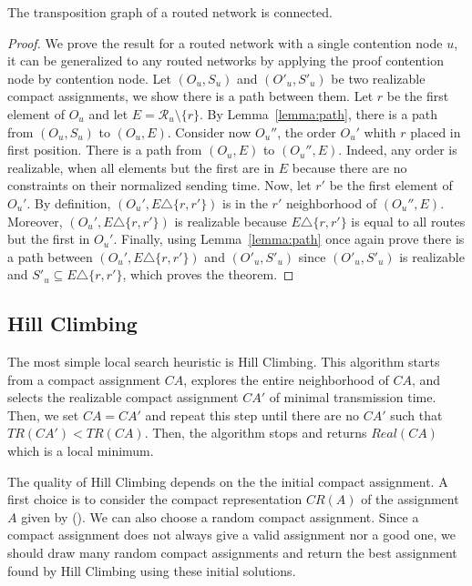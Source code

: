  \begin{theorem}
 The transposition graph of a routed network is connected.
 \end{theorem}
 \begin{proof}
 We prove the result for a routed network with a single contention node $u$, it can be generalized to any routed networks 
 by applying the proof contention node by contention node. Let $(O_u,S_u)$ and $(O'_u,S'_u)$ be two realizable compact assignments, we show there is a path between them. Let $r$ be the first element of 
$O_u$ and let $E = \mathcal{R}_u \setminus \{ r \}$. By Lemma~\ref{lemma:path}, there is a path from 
$(O_u,S_u)$ to $(O_u,E)$. Consider now $O_u''$, the order $O_u'$ whith $r$ placed in first position.
There is a path from $(O_u,E)$ to $(O_u'',E)$. Indeed, any order is realizable, when all elements but the first
are in $E$ because there are no constraints on their normalized sending time. 
Now, let $r'$ be the first element of $O_u'$. By definition, $(O_u',E \triangle \{r,r'\})$ is in the $r'$ neighborhood of $(O_u'',E)$. Moreover, $(O_u',E \triangle \{r,r'\})$ is realizable because $E \triangle \{r,r'\}$ is equal to all routes but the first in $O_u'$. 
Finally, using Lemma~\ref{lemma:path} once again prove there is a path between $(O_u',E \triangle \{r,r'\})$ and $(O'_u,S'_u)$ since $(O'_u,S'_u)$ is realizable and $S'_u \subseteq E \triangle \{r,r'\}$, which proves the theorem.
 \end{proof}




\subsection{Hill Climbing}\label{sec:hillclimb}

The most simple local search heuristic is Hill Climbing. This algorithm starts from a compact assignment $CA$, explores the entire neighborhood of $CA$, and selects the realizable compact assignment $CA'$ of minimal transmission time. Then, we set $CA = CA'$ and repeat this step until there are no $CA'$ such that $TR(CA') < TR(CA)$. Then, the algorithm stops and returns $Real(CA)$ which is a local minimum. 

The quality of Hill Climbing depends on the the initial compact assignment. A first choice is to consider the compact representation $CR(A)$ of the assignment $A$ given by \hybridgreedynormalized (\hgn). We can also choose a random compact assignment. Since a compact assignment does not always give a valid assignment nor a good one, we should draw many random compact assignments and return the best assignment found by Hill Climbing using these initial solutions.

